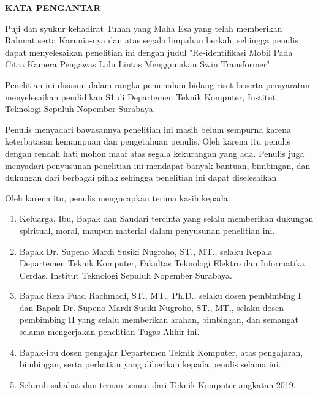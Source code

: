 \begin{center}
  \Large
  \textbf{KATA PENGANTAR}
\end{center}


\vspace{2ex}


Puji dan syukur kehadirat Tuhan yang Maha Esa yang telah memberikan Rahmat serta Karunia-nya 
dan atas segala limpahan berkah, sehingga penulis dapat menyelesaikan penelitian ini dengan judul 
"Re-identifikasi Mobil Pada Citra Kamera Pengawas Lalu Lintas Menggunakan Swin Transformer"

Penelitian ini disusun dalam rangka pemenuhan bidang riset beserta persyaratan menyelesaikan 
pendidikan S1 di Departemen Teknik Komputer, Institut Teknologi Sepuluh Nopember Surabaya.

Penulis menyadari bawasannya penelitian ini masih belum sempurna karena keterbatasan kemampuan 
dan pengetahuan penulis. Oleh karena itu penulis dengan rendah hati mohon maaf atas segala 
kekurangan yang ada. Penulis juga menyadari penyusunan penelitian ini mendapat banyak 
bantuan, bimbingan, dan dukungan dari berbagai pihak sehingga penelitian ini dapat diselesaikan

Oleh karena itu, penulis mengucapkan terima kasih kepada:

\begin{enumerate}[nolistsep]

  \item Keluarga, Ibu, Bapak dan Saudari tercinta yang selalu memberikan dukungan spiritual, moral, maupun 
  material dalam penyusunan penelitian ini.

  \item Bapak Dr. Supeno Mardi Susiki Nugroho, ST., MT., selaku Kepala Departemen Teknik Komputer, Fakultas 
  Teknologi Elektro dan Informatika Cerdas, Institut Teknologi Sepuluh Nopember Surabaya.

  \item Bapak Reza Fuad Rachmadi, ST., MT., Ph.D., selaku dosen pembimbing I dan Bapak Dr. Supeno Mardi 
  Susiki Nugroho, ST., MT., selaku dosen pembimbing II yang selalu memberikan arahan, bimbingan, dan semangat 
  selama mengerjakan penelitian Tugas Akhir ini.

  \item Bapak-ibu dosen pengajar Departemen Teknik Komputer, atas pengajaran, bimbingan, serta perhatian 
  yang diberikan kepada penulis selama ini.

  \item Seluruh sahabat dan teman-teman dari Teknik Komputer angkatan 2019.

\end{enumerate}

